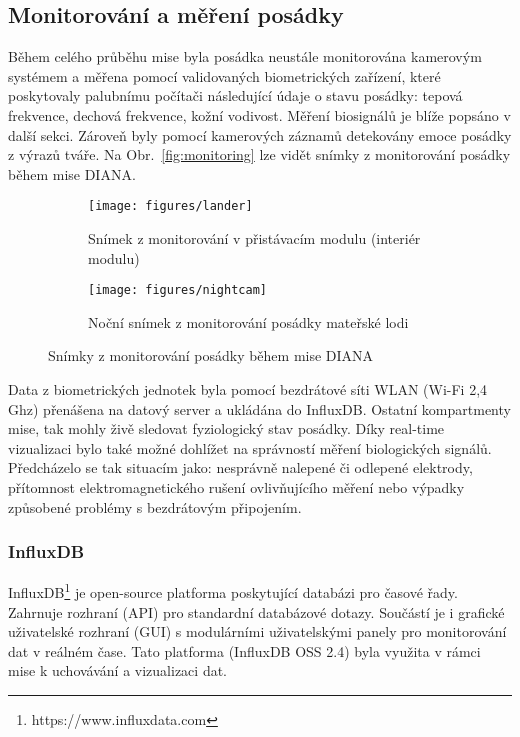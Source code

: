 \subsection{Monitorování a měření posádky}
\label{subsec:monitorovani posadky}
Během celého průběhu mise byla posádka neustále monitorována kamerovým systémem
a měřena pomocí validovaných biometrických zařízení, které poskytovaly palubnímu
počítači následující údaje o stavu posádky: tepová frekvence, dechová frekvence,
kožní vodivost. Měření biosignálů je blíže popsáno v další sekci. Zároveň byly
pomocí kamerových záznamů detekovány emoce posádky z výrazů tváře. Na
Obr.~\ref{fig:monitoring} lze vidět snímky z monitorování posádky během mise
DIANA.

\begin{figure}[h]
    \begin{subfigure}[h]{0.48\linewidth}
        \texttt{[image: figures/lander]}
        \caption{Snímek z monitorování v přistávacím modulu (interiér modulu)}
    \end{subfigure}
    \hfill
    \begin{subfigure}[h]{0.48\linewidth}
        \texttt{[image: figures/nightcam]}
        \caption{Noční snímek z monitorování posádky mateřské lodi}
    \end{subfigure}
    \caption{Snímky z monitorování posádky během mise DIANA}
\end{figure}

Data z biometrických jednotek byla pomocí bezdrátové síti WLAN (Wi-Fi 2,4 Ghz)
přenášena na datový server a ukládána do InfluxDB. Ostatní kompartmenty mise,
tak mohly živě sledovat fyziologický stav posádky. Díky real-time vizualizaci
bylo také možné dohlížet na správností měření biologických signálů. Předcházelo
se tak situacím jako: nesprávně nalepené či odlepené elektrody, přítomnost
elektromagnetického rušení ovlivňujícího měření nebo výpadky způsobené problémy
s bezdrátovým připojením.

\subsubsection{InfluxDB}
\label{subsec:influx}
InfluxDB\footnote{https://www.influxdata.com} je open-source platforma
poskytující databázi pro časové řady. Zahrnuje rozhraní (API) pro standardní
databázové dotazy. Součástí je i grafické uživatelské rozhraní (GUI) s
modulárními uživatelskými panely pro monitorování dat v reálném čase. Tato
platforma (InfluxDB OSS 2.4) byla využita v rámci mise k uchovávání a
vizualizaci dat.

